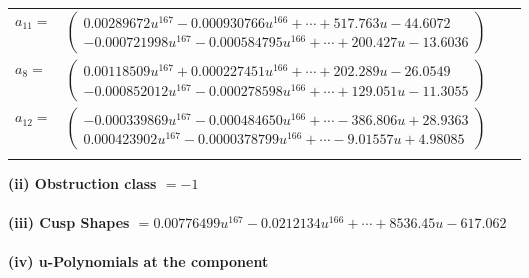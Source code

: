 \documentclass[1p]{elsarticle_modified}
\theoremstyle{definition}
\begin{document}
\begin{tabular}{m{7pt} m{180pt} m{7pt} m{180pt} }
\flushright $a_{11}=$&$\begin{pmatrix}0.00289672 u^{167}-0.000930766 u^{166}+\cdots+517.763 u-44.6072\\-0.000721998 u^{167}-0.000584795 u^{166}+\cdots+200.427 u-13.6036\end{pmatrix}$ \\
\flushright $a_{8}=$&$\begin{pmatrix}0.00118509 u^{167}+0.000227451 u^{166}+\cdots+202.289 u-26.0549\\-0.000852012 u^{167}-0.000278598 u^{166}+\cdots+129.051 u-11.3055\end{pmatrix}$ \\
\flushright $a_{12}=$&$\begin{pmatrix}-0.000339869 u^{167}-0.000484650 u^{166}+\cdots-386.806 u+28.9363\\0.000423902 u^{167}-0.0000378799 u^{166}+\cdots-9.01557 u+4.98085\end{pmatrix}$\\&\end{tabular}
\flushleft \textbf{(ii) Obstruction class $= -1$}\\~\\
\flushleft \textbf{(iii) Cusp Shapes $= 0.00776499 u^{167}-0.0212134 u^{166}+\cdots+8536.45 u-617.062$}\\~\\
\newpage\renewcommand{\arraystretch}{1}
\flushleft \textbf{(iv) u-Polynomials at the component}\newline \\
\end{document}
